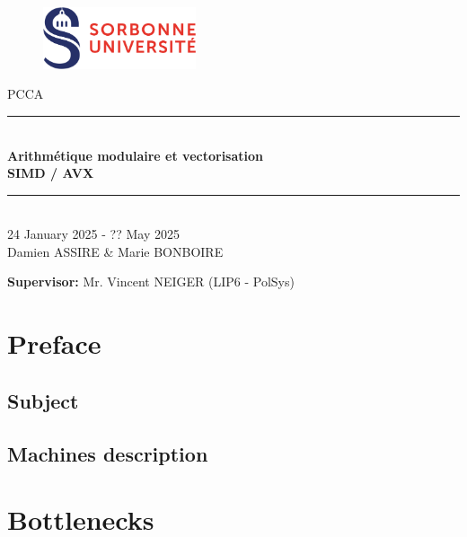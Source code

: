 \documentclass[a4paper]{article}
\begin{document}
\thispagestyle{plain}
\begin{titlepage}
    \begin{figure}[h]
        \centering
        \includegraphics[width=0.4\textwidth]{su.png}
    \end{figure}
    \vspace{1cm}

    \begin{center}
        {\LARGE PCCA}\\[0.3cm]
        \rule{\linewidth}{0.5mm} \\[0.4cm]
        {\huge \textbf{Arithmétique modulaire et vectorisation\\ SIMD / AVX}}\\[0.4cm]
        \rule{\linewidth}{0.5mm} \\[1cm]
        {\large 24 January 2025 - ?? May 2025}\\[3cm]

        {\Large Damien ASSIRE \& Marie BONBOIRE}


    \end{center}

    \vfill
\begin{flushleft}{\large
    \textbf{Supervisor:} Mr. Vincent NEIGER (LIP6 - PolSys)\\
    }
\end{flushleft}
\end{titlepage}
\newpage

\tableofcontents
\newpage

\section{Preface}

\subsection{Subject}
\subsection{Machines description}

\section{Bottlenecks}
\end{document}
